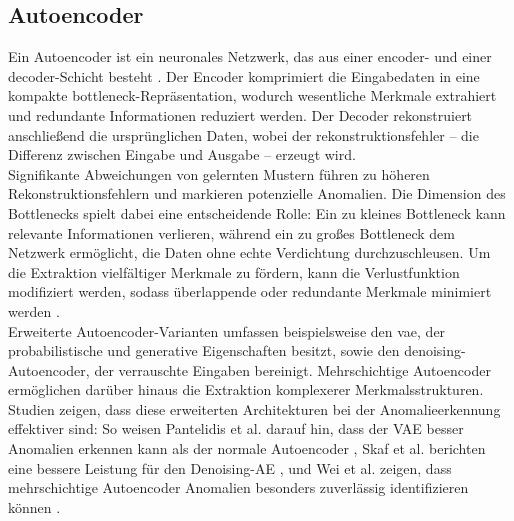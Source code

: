 \documentclass[a4paper,12pt]{article}
\begin{document}
	\subsection{Autoencoder}
	Ein Autoencoder ist ein neuronales Netzwerk, das aus einer \gls{encoder}- und einer \gls{decoder}-Schicht besteht \cite[S.3]{michelucci2022introduction}. Der Encoder komprimiert die Eingabedaten in eine kompakte \gls{bottleneck}-Repräsentation, wodurch wesentliche Merkmale extrahiert und redundante Informationen reduziert werden. Der Decoder rekonstruiert anschließend die ursprünglichen Daten, wobei der \gls{rekonstruktionsfehler} – die Differenz zwischen Eingabe und Ausgabe – erzeugt wird.
	\\[0.5em]
	Signifikante Abweichungen von gelernten Mustern führen zu höheren Rekonstruktionsfehlern und markieren potenzielle Anomalien. Die Dimension des Bottlenecks spielt dabei eine entscheidende Rolle: Ein zu kleines Bottleneck kann relevante Informationen verlieren, während ein zu großes Bottleneck dem Netzwerk ermöglicht, die Daten ohne echte Verdichtung durchzuschleusen. Um die Extraktion vielfältiger Merkmale zu fördern, kann die Verlustfunktion modifiziert werden, sodass überlappende oder redundante Merkmale minimiert werden \cite{laakom2022reducing}.
	\\[0.5em]
	Erweiterte Autoencoder-Varianten umfassen beispielsweise den \gls{vae}, der probabilistische und generative Eigenschaften besitzt, sowie den \gls{denoising}-Autoencoder, der verrauschte Eingaben bereinigt. Mehrschichtige Autoencoder ermöglichen darüber hinaus die Extraktion komplexerer Merkmalsstrukturen. Studien zeigen, dass diese erweiterten Architekturen bei der Anomalieerkennung effektiver sind: So weisen Pantelidis et al. darauf hin, dass der VAE besser Anomalien erkennen kann als der normale Autoencoder \cite{Pantelidis2021}, Skaf et al. berichten eine bessere Leistung für den Denoising-AE \cite{Skaf2022}, und Wei et al. zeigen, dass mehrschichtige Autoencoder Anomalien besonders zuverlässig identifizieren können \cite{Wei2020}.
\end{document}
